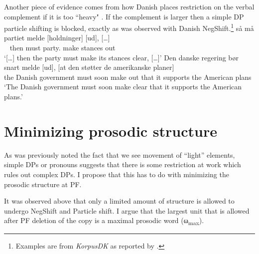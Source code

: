 \documentclass[12pt, letterpaper]{article}
\newcommand{\sub}[1]{\textsubscript{#1}}
\begin{document}
Another piece of evidence comes from how Danish places restriction on the verbal complement if it is too ``heavy" \citep[44f]{mullerDanishHeadDrivenPhraseInpreparation}. If the complement is larger then a simple DP particle shifting is blocked, exactly as was observed with Danish NegShift.\footnote{Examples are from \emph{KorpusDK} as reported by \citet{mullerDanishHeadDrivenPhraseInpreparation}.} 
	\ea \gll {[…]} så må partiet melde [holdninger] [ud], {[…]}\\
	~ then must party.\Def{} make stances out\\
	\glt `{[…]} then the party must make its stances clear, {[…]}'
	\ex \gll Den danske regering bør snart melde [ud], [at den støtter de amerikanske planer]\\
	the Danish government must soon make out that it supports the American plans\\
	\glt `The Danish government must soon make clear that it supports the American plans.'
	\z 

\section{Minimizing prosodic structure} \label{sec:PF}

As was previously noted the fact that we see movement of ``light'' elements, simple DPs or pronouns suggests that there is some restriction at work which rules out complex DPs. I propose that this has to do with minimizing the prosodic structure at PF. 

It was observed above that only a limited amount of structure is allowed to undergo NegShift and Particle shift. I argue that the largest unit that is allowed after PF deletion of the copy is a maximal prosodic word (ω\sub{max}).
\end{document}
